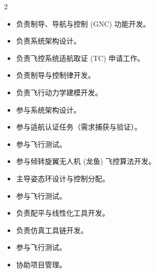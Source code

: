 \documentclass[10pt,a4paper,ragged2e,withhyper]{altacv}
\begin{document}
\begin{paracol}{2}
            \begin{itemize}
                \item 负责制导、导航与控制 (GNC) 功能开发。
                \item 负责系统架构设计。
                \item 负责飞控系统适航取证 (TC) 申请工作。
            \end{itemize}
            \bigskip
            
            \begin{itemize}
                \item 负责制导与控制律开发。
                \item 负责飞行动力学建模开发。
                \item 参与系统架构设计。
                \item 参与适航认证任务（需求捕获与验证）。
                \item 参与飞行测试。
            \end{itemize}
            \bigskip
            
            \begin{itemize}
                \item 参与倾转旋翼无人机 (龙鱼) 飞控算法开发。
                \item 主导姿态环设计与控制分配。
                \item 参与飞行测试。
            \end{itemize}
            \bigskip

            \begin{itemize}
                \item 负责配平与线性化工具开发。
                \item 负责仿真工具链开发。
                \item 参与飞行测试。
                \item 协助项目管理。
            \end{itemize}
    
    \newpage


\end{paracol}
\end{document}
